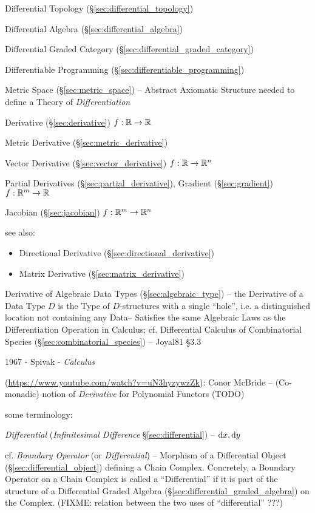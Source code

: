 \fist Differential Topology (\S\ref{sec:differential_topology})

\fist Differential Algebra (\S\ref{sec:differential_algebra})

\fist Differential Graded Category (\S\ref{sec:differential_graded_category})

\fist Differentiable Programming (\S\ref{sec:differentiable_programming})

\fist Metric Space (\S\ref{sec:metric_space}) -- Abstract Axiomatic Structure
needed to define a Theory of \emph{Differentiation}

Derivative (\S\ref{sec:derivative}) $f : \mathbb{R} \rightarrow \mathbb{R}$

Metric Derivative (\S\ref{sec:metric_derivative})

Vector Derivative (\S\ref{sec:vector_derivative})
$f : \mathbb{R} \rightarrow \mathbb{R}^n$

Partial Derivatives (\S\ref{sec:partial_derivative}), Gradient
(\S\ref{sec:gradient}) $f : \mathbb{R}^m \rightarrow \mathbb{R}$

Jacobian (\S\ref{sec:jacobian}) $f : \mathbb{R}^m \rightarrow \mathbb{R}^n$

see also:

\begin{itemize}
  \item Directional Derivative (\S\ref{sec:directional_derivative})
  \item Matrix Derivative (\S\ref{sec:matrix_derivative})
\end{itemize}

\fist Derivative of Algebraic Data Types (\S\ref{sec:algebraic_type}) -- the
Derivative of a Data Type $D$ is the Type of $D$-structures with a single
``hole'', i.e. a distinguished location not containing any Data-- Satisfies the
same Algebraic Laws as the Differentiation Operation in Calculus;
cf. Differential Calculus of Combinatorial Species
(\S\ref{sec:combinatorial_species}) -- Joyal81 \S3.3

1967 - Spivak - \emph{Calculus}

(\url{https://www.youtube.com/watch?v=uN3hyzywzZk}): Conor McBride --
(Co-monadic) notion of \emph{Derivative} for Polynomial Functors (TODO)

some terminology:

\emph{Differential} (\emph{Infinitesimal Difference} \S\ref{sec:differential})
-- $\mathrm{d}x, \mathrm{d}y$

\fist cf. \emph{Boundary Operator} (or \emph{Differential}) -- Morphism of a
Differential Object (\S\ref{sec:differential_object}) defining a Chain Complex.
Concretely, a Boundary Operator on a Chain Complex is called a ``Differential''
if it is part of the structure of a Differential Graded Algebra
(\S\ref{sec:differential_graded_algebra}) on the Complex.
(FIXME: relation between the two uses of ``differential'' ???)

